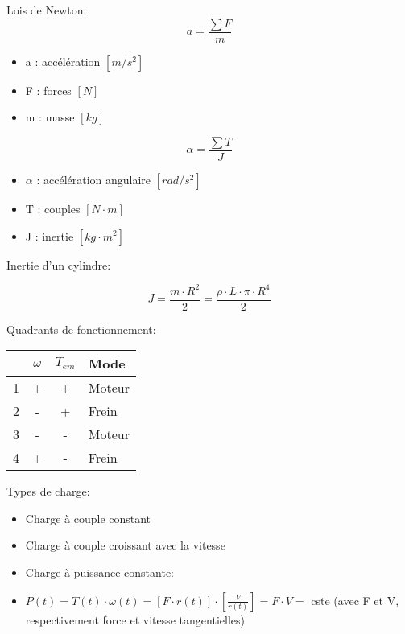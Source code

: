 \documentclass[10pt]{article} %
\begin{document}
\begin{multicols}{3}
				Lois de Newton:
				\[a = \frac{\sum F}{m}\]
				
				\begin{itemize}
					\item a : accélération $[m/s^2]$
					\item F : forces $[N]$
					\item m : masse $[kg]$
				\end{itemize}
		
				\[\alpha = \frac{\sum T}{J} \]
		
				\begin{itemize} 
					\item $\alpha$ : accélération angulaire $[rad/s^2]$
					\item T : couples $[N \cdot m]$
					\item J : inertie $[kg \cdot m^2]$
				\end{itemize}
		
				Inertie d'un cylindre:
				
				\[ J = \frac{m \cdot R^2}{2} = \frac{\rho \cdot L \cdot \pi \cdot R^4}{2} \]
				
				Quadrants de fonctionnement:
				
				\begin{table}[H]
				\begin{tabular}{|c|c|c|l|}
				\hline
					& $\omega$ & $T_{em}$ & Mode   \\ \hline
				1 & +        & +        & Moteur \\ \hline
				2 & -        & +        & Frein  \\ \hline
				3 & -        & -        & Moteur \\ \hline
				4 & +        & -        & Frein  \\ \hline
				\end{tabular}
				\centering
				\end{table}
				
				Types de charge:
				
				\begin{itemize}
					\item Charge à couple constant
					\item Charge à couple croissant avec la vitesse
					\item Charge à puissance constante:
					\item [] $P(t)=T(t) \cdot \omega(t)=[F \cdot r(t)] \cdot\left[\frac{V}{r(t)}\right]=F \cdot V=$ cste (avec F et V, respectivement force et vitesse tangentielles)
				\end{itemize}
				

\end{multicols}
\end{document}
